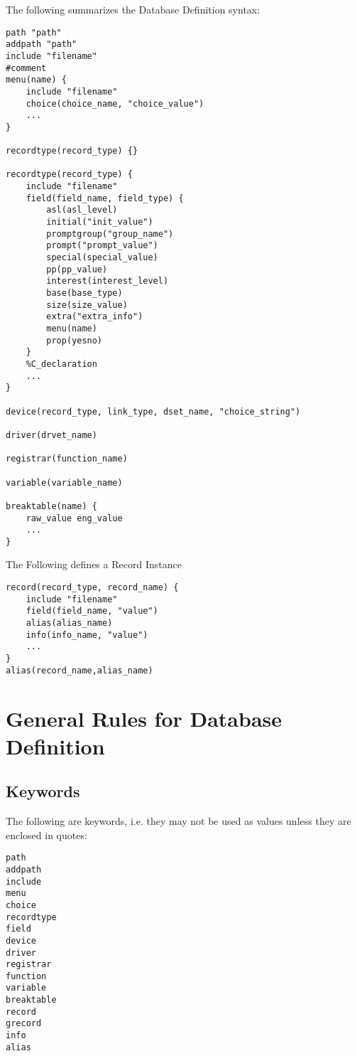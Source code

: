The following summarizes the Database Definition syntax:

\begin{verbatim}
path "path"
addpath "path"
include "filename"
#comment
menu(name) {
    include "filename"
    choice(choice_name, "choice_value")
    ...
}

recordtype(record_type) {}

recordtype(record_type) {
    include "filename"
    field(field_name, field_type) {
        asl(asl_level)
        initial("init_value")
        promptgroup("group_name")
        prompt("prompt_value")
        special(special_value)
        pp(pp_value)
        interest(interest_level)
        base(base_type)
        size(size_value)
        extra("extra_info")
        menu(name)
        prop(yesno)
    }
    %C_declaration
    ...
}

device(record_type, link_type, dset_name, "choice_string")

driver(drvet_name)

registrar(function_name)

variable(variable_name)

breaktable(name) {
    raw_value eng_value
    ...
}
\end{verbatim}

The Following defines a Record Instance

\begin{verbatim}
record(record_type, record_name) {
    include "filename"
    field(field_name, "value")
    alias(alias_name)
    info(info_name, "value")
    ...
}
alias(record_name,alias_name)
\end{verbatim}

\section{General Rules for Database Definition}

\subsection{Keywords}

The following are keywords, i.e. they may not be used as values unless they are enclosed in quotes:

\begin{verbatim}
path
addpath
include
menu
choice
recordtype
field
device
driver
registrar
function
variable
breaktable
record
grecord
info
alias
\end{verbatim}


